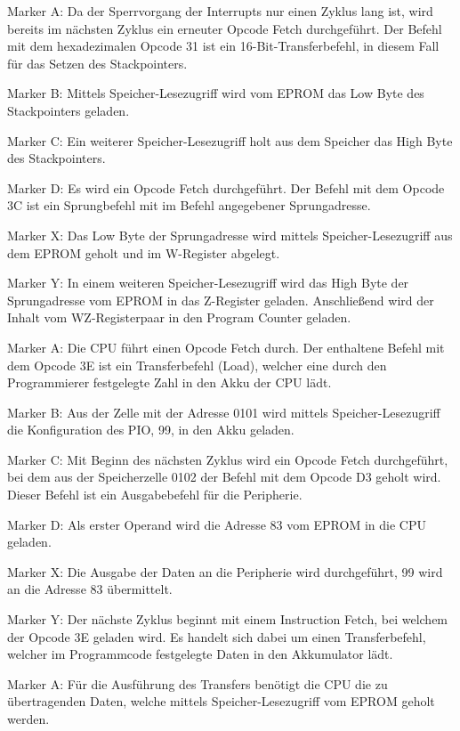 Marker A: Da der Sperrvorgang der Interrupts nur einen Zyklus lang ist, wird bereits im nächsten Zyklus ein erneuter Opcode Fetch durchgeführt. Der Befehl mit dem hexadezimalen Opcode 31 ist ein 16-Bit-Transferbefehl, in diesem Fall für das Setzen des Stackpointers.

Marker B: Mittels Speicher-Lesezugriff wird vom EPROM das Low Byte des Stackpointers geladen.

Marker C: Ein weiterer Speicher-Lesezugriff holt aus dem Speicher das High Byte des Stackpointers.

Marker D: Es wird ein Opcode Fetch durchgeführt. Der Befehl mit dem Opcode 3C ist ein Sprungbefehl mit im Befehl angegebener Sprungadresse.

Marker X: Das Low Byte der Sprungadresse wird mittels Speicher-Lesezugriff aus dem EPROM geholt und im W-Register abgelegt.

Marker Y: In einem weiteren Speicher-Lesezugriff wird das High Byte der Sprungadresse vom EPROM in das Z-Register geladen. Anschließend wird der Inhalt vom WZ-Registerpaar in den Program Counter geladen.

Marker A: Die CPU führt einen Opcode Fetch durch. Der enthaltene Befehl mit dem Opcode 3E ist ein Transferbefehl (Load), welcher eine durch den Programmierer festgelegte Zahl in den Akku der CPU lädt.

Marker B: Aus der Zelle mit der Adresse 0101 wird mittels Speicher-Lesezugriff die Konfiguration des PIO, 99, in den Akku geladen.

Marker C: Mit Beginn des nächsten Zyklus wird ein Opcode Fetch durchgeführt, bei dem aus der Speicherzelle 0102 der Befehl mit dem Opcode D3 geholt wird. Dieser Befehl ist ein Ausgabebefehl für die Peripherie.

Marker D: Als erster Operand wird die Adresse 83 vom EPROM in die CPU geladen.

Marker X: Die Ausgabe der Daten an die Peripherie wird durchgeführt, 99 wird an die Adresse 83 übermittelt.

Marker Y: Der nächste Zyklus beginnt mit einem Instruction Fetch, bei welchem der Opcode 3E geladen wird. Es handelt sich dabei um einen Transferbefehl, welcher im Programmcode festgelegte Daten in den Akkumulator lädt.

Marker A: Für die Ausführung des Transfers benötigt die CPU die zu übertragenden Daten, welche mittels Speicher-Lesezugriff vom EPROM geholt werden.

